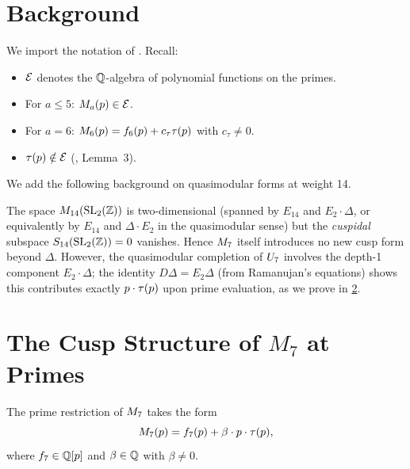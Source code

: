 \documentclass[11pt]{article}
\begin{document}
\section{Background}
\label{sec:background}

We import the notation of \cite{Randsley2025a}.
Recall:
\begin{itemize}[leftmargin=*]
  \item $\mathcal{E}$ denotes the $\mathbb{Q}$-algebra of polynomial functions on the primes.
  \item For $a\le 5$: $M_{a}(p)\in\mathcal{E}$.
  \item For $a=6$: $M_{6}(p) = f_6(p) + c_\tau\tau(p)$ with $c_\tau\ne 0$.
  \item $\tau(p)\notin\mathcal{E}$ (\cite{Randsley2025a}, Lemma~3).
\end{itemize}

We add the following background on quasimodular forms at weight 14.

\begin{remark}
The space $M_{14}(\operatorname{SL}_2(\mathbb{Z}))$ is two-dimensional (spanned by $E_{14}$ and
$E_2\cdot\Delta$, or equivalently by $E_{14}$ and $\Delta\cdot E_2$ in the quasimodular
sense) but the \emph{cuspidal} subspace $S_{14}(\operatorname{SL}_2(\mathbb{Z}))=0$ vanishes.
Hence $M_{7}$ itself introduces no new cusp form beyond $\Delta$.
However, the quasimodular completion of $U_{7}$ involves the depth-1 component
$E_2\cdot\Delta$; the identity $D\Delta=E_2\Delta$ (from Ramanujan's equations) shows
this contributes exactly $p\cdot\tau(p)$ upon prime evaluation, as we prove in
\cref{sec:M7-structure}.
\end{remark}

\section{The Cusp Structure of $M_7$ at Primes}
\label{sec:M7-structure}

\begin{proposition}
\label{lem:M7-cusp}
The prime restriction of $M_{7}$ takes the form
\[
  M_{7}(p) = f_7(p) + \beta\cdot p\cdot\tau(p),
\]
where $f_7\in\mathbb{Q}[p]$ and $\beta\in\mathbb{Q}$ with $\beta\ne 0$.
\end{proposition}
\end{document}
